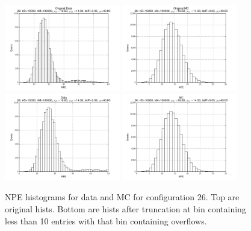  \begin{figure}[htbp] \begin{center} 
\includegraphics[width=0.45\textwidth]{../FIGURES/26/FIG_Original_Data.pdf} 
\includegraphics[width=0.45\textwidth]{../FIGURES/26/FIG_Original_MC.pdf} 
\includegraphics[width=0.45\textwidth]{../FIGURES/26/FIG_Data.pdf} 
\includegraphics[width=0.45\textwidth]{../FIGURES/26/FIG_MC.pdf} 
\caption{NPE histograms for data and MC for configuration 26. Top are original hists. Bottom are hists after truncation at bin containing less than 10 entries with that bin containing overflows.} 
\label{tab:npe_26} 
\end{center} \end{figure} 

 